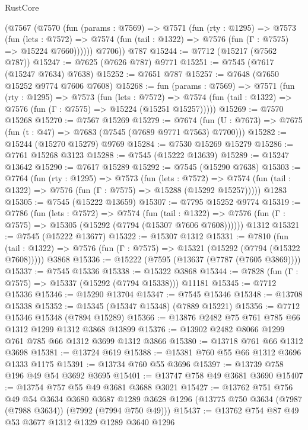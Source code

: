 \begin{lexlean}{RustCore}
\begin{coremodule}
      (@7567
        (@7570
          (fun (params : @7569) =>
          @7571
            (fun (rty : @1295) =>
            @7573
              (fun (lets : @7572) =>
              @7574 (fun (tail : @1322) => @7576 (fun (Γ : @7575) => @15224 @7660))))))
        @7706))
    @787
@15244 := @7712 (@15217 (@7562 @787))
@15247 := @7625 (@7626 @787) @9771
@15251 := @7545 (@7617 (@15247 @7634) @7638)
@15252 := @7651 @787
@15257 := @7648 (@7650 @15252 @9774 @7606 @7608)
@15268 := fun (params : @7569) =>
  @7571
    (fun (rty : @1295) =>
    @7573
      (fun (lets : @7572) =>
      @7574 (fun (tail : @1322) => @7576 (fun (Γ : @7575) => @15224 (@15251 @15257)))))
@15269 := @7570 @15268
@15270 := @7567 @15269
@15279 := @7674
    (fun (U : @7673) => @7675 (fun (t : @47) => @7683 (@7545 (@7689 @9771 @7563) @7700)))
@15282 := @15244 (@15270 @15279) @9769
@15284 := @7530 @15269 @15279
@15286 := @7761 @15268 @3123
@15288 := @7545 (@15222 @13639)
@15289 := @15247 @13642
@15290 := @7617 @15289
@15292 := @7545 (@15290 @7638)
@15303 := @7764
    (fun (rty : @1295) =>
    @7573
      (fun (lets : @7572) =>
      @7574 (fun (tail : @1322) => @7576 (fun (Γ : @7575) => @15288 (@15292 @15257)))))
    @1283
@15305 := @7545 (@15222 @13659)
@15307 := @7795 @15252 @9774
@15319 := @7786
    (fun (lets : @7572) =>
    @7574
      (fun (tail : @1322) =>
      @7576 (fun (Γ : @7575) => @15305 (@15292 (@7794 (@15307 @7606 @7608))))))
    @1312
@15321 := @7545 (@15222 @13677)
@15322 := @15307 @1312
@15331 := @7810
    (fun (tail : @1322) => @7576 (fun (Γ : @7575) => @15321 (@15292 (@7794 (@15322 @7608)))))
    @3868
@15336 := @15222 (@7595 (@13637 (@7787 (@7605 @3869))))
@15337 := @7545 @15336
@15338 := @15322 @3868
@15344 := @7828 (fun (Γ : @7575) => @15337 (@15292 (@7794 @15338))) @11181
@15345 := @7712 @15336
@15346 := @15290 @13704
@15347 := @7545 @15346
@15348 := @13708 @15338
@15352 := @15345 (@15347 @15348) (@7889 @15221)
@15356 := @7712 @15346 @15348 (@7894 @15289)
@15366 := @13876 @2482 @75 @761 @785 @66 @1312 @1299 @1312 @3868 @13899
@15376 := @13902 @2482 @8066 @1299 @761 @785 @66 @1312 @3699 @1312 @3866
@15380 := @13718 @761 @66 @1312 @3698
@15381 := @13724 @619
@15388 := @15381 @760 @55 @66 @1312 @3696 @1333 @1175
@15391 := @13734 @760 @55 @3696
@15397 := @13739 @758 @196 @49 @54 @3692 @3695
@15401 := @13747 @758 @49 @3681 @3690
@15407 := @13754 @757 @55 @49 @3681 @3688 @3021
@15427 := @13762
    @751
    @756
    @49
    @54
    @3634
    @3680
    @3687
    @1289
    @3628
    @1296
    (@13775 @750 @3634 (@7987 (@7988 @3634)) (@7992 (@7994 @750 @49)))
@15437 := @13762 @754 @87 @49 @53 @3677 @1312 @1329 @1289 @3640 @1296

\end{coremodule}
\end{lexlean}
